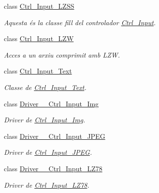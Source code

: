 \begin{DoxyCompactItemize}
class \hyperlink{classpersistencia_1_1input_1_1Ctrl__Input__LZSS}{Ctrl\+\_\+\+Input\+\_\+\+L\+Z\+SS}
\begin{DoxyCompactList}\small\item\em Aquesta és la classe fill del controlador \hyperlink{classpersistencia_1_1input_1_1Ctrl__Input}{Ctrl\+\_\+\+Input}. \end{DoxyCompactList}\item 
class \hyperlink{classpersistencia_1_1input_1_1Ctrl__Input__LZW}{Ctrl\+\_\+\+Input\+\_\+\+L\+ZW}
\begin{DoxyCompactList}\small\item\em Acces a un arxiu comprimit amb L\+ZW. \end{DoxyCompactList}\item 
class \hyperlink{classpersistencia_1_1input_1_1Ctrl__Input__Text}{Ctrl\+\_\+\+Input\+\_\+\+Text}
\begin{DoxyCompactList}\small\item\em Classe de \hyperlink{classpersistencia_1_1input_1_1Ctrl__Input__Text}{Ctrl\+\_\+\+Input\+\_\+\+Text}. \end{DoxyCompactList}\item 
class \hyperlink{classpersistencia_1_1input_1_1Driver____Ctrl__Input__Img}{Driver\+\_\+\+\_\+\+Ctrl\+\_\+\+Input\+\_\+\+Img}
\begin{DoxyCompactList}\small\item\em Driver de \hyperlink{classpersistencia_1_1input_1_1Ctrl__Input__Img}{Ctrl\+\_\+\+Input\+\_\+\+Img}. \end{DoxyCompactList}\item 
class \hyperlink{classpersistencia_1_1input_1_1Driver____Ctrl__Input__JPEG}{Driver\+\_\+\+\_\+\+Ctrl\+\_\+\+Input\+\_\+\+J\+P\+EG}
\begin{DoxyCompactList}\small\item\em Driver de \hyperlink{classpersistencia_1_1input_1_1Ctrl__Input__JPEG}{Ctrl\+\_\+\+Input\+\_\+\+J\+P\+EG}. \end{DoxyCompactList}\item 
class \hyperlink{classpersistencia_1_1input_1_1Driver____Ctrl__Input__LZ78}{Driver\+\_\+\+\_\+\+Ctrl\+\_\+\+Input\+\_\+\+L\+Z78}
\begin{DoxyCompactList}\small\item\em Driver de \hyperlink{classpersistencia_1_1input_1_1Ctrl__Input__LZ78}{Ctrl\+\_\+\+Input\+\_\+\+L\+Z78}. \end{DoxyCompactList}\item 

\end{DoxyCompactItemize}
